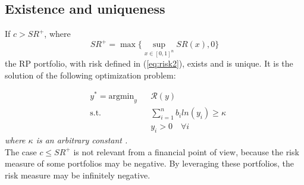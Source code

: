 \subsection{Existence and uniqueness}
\begin{theorem}
If $c > SR^+$, where
\begin{equation}
SR^+ = \max \big\{\sup_{x \in [0,1]^n} SR(x), 0\big\}
\end{equation}
the RP portfolio, with risk defined in (\ref{eq:risk2}), exists and is unique. It is the solution of the following optimization problem:
\end{theorem}
\begin{equation}
\begin{aligned}
& y^* = {\text{argmin}_y}
&& \mathcal{R}(y)\\
& \text{s.t.}
&&\sum_{i=1}^n b_i ln(y_i) \geq \kappa\\
&&&y_i > 0 \hspace{1em} \forall i
\end{aligned}
\end{equation}
\emph{where $\kappa$ is an arbitrary constant \cite{intr}.}\\
The case $c \leq SR^+$ is not relevant from a financial point of view, because the risk measure of some portfolios may be negative. By leveraging these portfolios, the risk measure may be infinitely negative.
